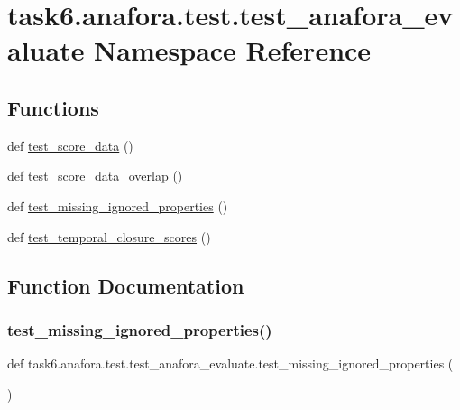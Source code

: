 \hypertarget{namespacetask6_1_1anafora_1_1test_1_1test__anafora__evaluate}{}\section{task6.\+anafora.\+test.\+test\+\_\+anafora\+\_\+evaluate Namespace Reference}
\label{namespacetask6_1_1anafora_1_1test_1_1test__anafora__evaluate}
\subsection*{Functions}
\begin{DoxyCompactItemize}
\item 
def \hyperlink{namespacetask6_1_1anafora_1_1test_1_1test__anafora__evaluate_ad57745cdf6429788e7ac4def05ded364}{test\+\_\+score\+\_\+data} ()
\item 
def \hyperlink{namespacetask6_1_1anafora_1_1test_1_1test__anafora__evaluate_aa47c334a01dd9e72d5e20d96c1fdde24}{test\+\_\+score\+\_\+data\+\_\+overlap} ()
\item 
def \hyperlink{namespacetask6_1_1anafora_1_1test_1_1test__anafora__evaluate_a45a583a29e2766a5306b84395ea4b59c}{test\+\_\+missing\+\_\+ignored\+\_\+properties} ()
\item 
def \hyperlink{namespacetask6_1_1anafora_1_1test_1_1test__anafora__evaluate_a2555eed0876ff279649d083d9760a4dd}{test\+\_\+temporal\+\_\+closure\+\_\+scores} ()
\end{DoxyCompactItemize}


\subsection{Function Documentation}
\mbox{\label{namespacetask6_1_1anafora_1_1test_1_1test__anafora__evaluate_a45a583a29e2766a5306b84395ea4b59c}} 
\subsubsection{\texorpdfstring{test\+\_\+missing\+\_\+ignored\+\_\+properties()}{test\_missing\_ignored\_properties()}}
{\footnotesize\ttfamily def task6.\+anafora.\+test.\+test\+\_\+anafora\+\_\+evaluate.\+test\+\_\+missing\+\_\+ignored\+\_\+properties (\begin{DoxyParamCaption}{ }\end{DoxyParamCaption})}

